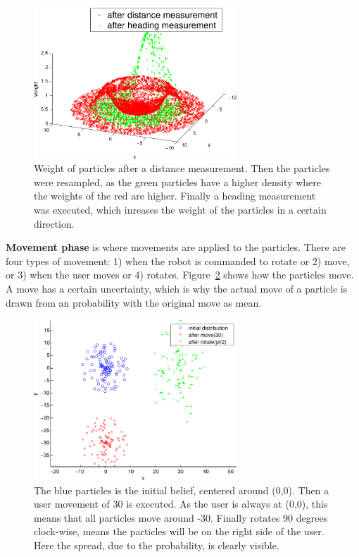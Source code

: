 \documentclass[journal]{IEEEtran}
\let\MYoriglatexcaption\caption
\renewcommand{\caption}[2][\relax]{\MYoriglatexcaption[#2]{#2}}
\begin{document}
\begin{figure}[!htpb]
 \centering
 \includegraphics[width=3in]{images/particle-measure.pdf}
 \caption{Weight of particles after a distance measurement. Then the particles
 were resampled, as the green particles have a higher density where the weights
of the red are higher. Finally a heading measurement was executed, which
inreases the weight of the particles in a certain direction.}
 \label{fig:particle-measurement}
\end{figure}


\textbf{Movement phase} is where movements are applied to the particles. There
are four types of movement: 1) when the robot is commanded to rotate or 2) move,
or 3) when the user moves or 4) rotates. Figure~\ref{fig:particle-move} shows
how the particles move. A move has a certain uncertainty, which is why the
actual move of a particle is drawn from an probability with the original move
as mean.

\begin{figure}[!htpb]
 \centering
 \includegraphics[width=3in]{images/particle-move.pdf}
 \caption{The blue particles is the initial belief, centered around (0,0). Then
 a user movement of 30 is executed. As the user is always at (0,0), this means
that all particles move around -30. Finally rotates 90 degrees clock-wise,
means the particles will be on the right side of the user. Here the spread,
due to the probability, is clearly visible.}
 \label{fig:particle-move}
\end{figure}
\end{document}

